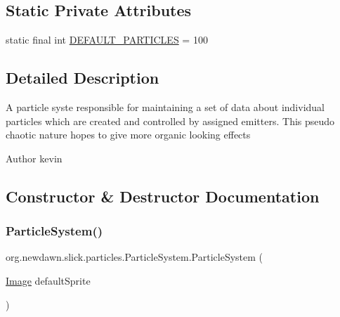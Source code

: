 \subsection*{Static Private Attributes}
\begin{DoxyCompactItemize}
\item 
static final int \mbox{\hyperlink{classorg_1_1newdawn_1_1slick_1_1particles_1_1_particle_system_a997a488279d52e891828eb1e3f2d5aff}{D\+E\+F\+A\+U\+L\+T\+\_\+\+P\+A\+R\+T\+I\+C\+L\+ES}} = 100
\end{DoxyCompactItemize}


\subsection{Detailed Description}
A particle syste responsible for maintaining a set of data about individual particles which are created and controlled by assigned emitters. This pseudo chaotic nature hopes to give more organic looking effects

\begin{DoxyAuthor}{Author}
kevin 
\end{DoxyAuthor}


\subsection{Constructor \& Destructor Documentation}
\mbox{\label{classorg_1_1newdawn_1_1slick_1_1particles_1_1_particle_system_a03c5c4ad49a3db42ebb36e87d2a18583}} 
\subsubsection{\texorpdfstring{Particle\+System()}{ParticleSystem()}\hspace{0.1cm}{\footnotesize\ttfamily [1/5]}}
{\footnotesize\ttfamily org.\+newdawn.\+slick.\+particles.\+Particle\+System.\+Particle\+System (\begin{DoxyParamCaption}\item[{\mbox{\hyperlink{classorg_1_1newdawn_1_1slick_1_1_image}{Image}}}]{default\+Sprite }\end{DoxyParamCaption})\hspace{0.3cm}{\ttfamily [inline]}}

